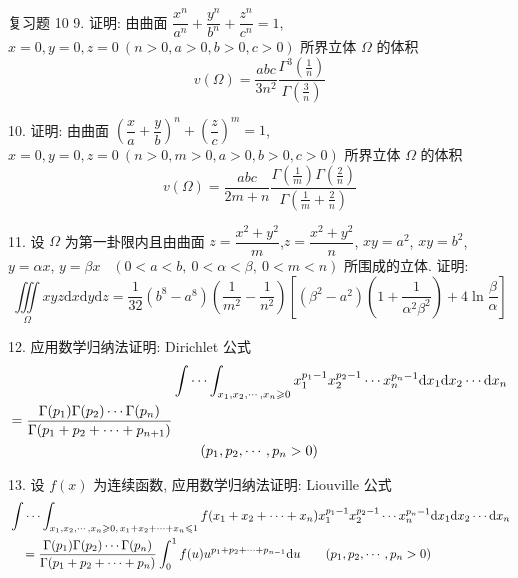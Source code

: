 \begin{exblock}{复习题 10}
9. 证明: 由曲面
$\dfrac{x^{n}}{a^{n}} + \dfrac{y^{n}}{b^{n}} + \dfrac{z^{n}}{c^{n}} = 1$,
$x=0, y=0, z=0\ (n > 0, a > 0, b > 0, c > 0)$
所界立体 $\Omega$ 的体积
\[
v(\Omega) = \frac{abc}{3n^{2}} \frac{\Gamma^{3}\left( \frac{1}{n} \right)}{\Gamma\left( \frac{3}{n} \right)}
\]

10. 证明: 由曲面
$\left( \dfrac{x}{a} + \dfrac{y}{b} \right)^{n} + \left( \dfrac{z}{c} \right)^{m} = 1$,
$x=0, y=0, z=0\ (n > 0, m > 0, a > 0, b > 0, c > 0)$
所界立体 $\Omega$ 的体积
\[
v(\Omega) = \frac{abc}{2m+n}
\frac{\Gamma\left( \frac{1}{m} \right)\Gamma\left( \frac{2}{n} \right)}
{\Gamma\left( \frac{1}{m}+\frac{2}{n} \right)}
\]

11. 设 $\Omega$ 为第一卦限内且由曲面
$z = \dfrac{x^{2}+y^{2}}{m}$,\quad $z = \dfrac{x^{2}+y^{2}}{n}$,\quad
$xy = a^{2}$, $xy = b^{2}$, $y = \alpha x$, $y = \beta x$
\ $(0 < a < b,\ 0 < \alpha < \beta,\ 0 < m < n)$
所围成的立体. 证明:
\[
\iiint\limits_{\Omega} xyz \mathrm{d}x\mathrm{d}y\mathrm{d}z
= \frac{1}{32}\left( b^{8} - a^{8} \right)
\left( \frac{1}{m^{2}} - \frac{1}{n^{2}} \right)
\left[ \left( \beta^{2}-a^{2} \right)
\left( 1 + \frac{1}{\alpha^{2}\beta^{2}} \right) + 4 \ln \frac{\beta}{\alpha} \right]
\]

12. 应用数学归纳法证明: Dirichlet 公式
\begin{align*}
&\idotsint _{x_{1},x_{2},\cdots,x_{n} \geqslant 0}
x_{1}^{p_{1}-1} x_{2}^{p_{2}-1} \cdots x_{n}^{p_{n}-1}
\mathrm{d}x_{1} \mathrm{d}x_{2} \cdots \mathrm{d}x_{n} \notag\\
= \frac{\Gamma(p_{1})\Gamma(p_{2}) \cdots \Gamma(p_{n})}
{\Gamma(p_{1}+p_{2}+\cdots+p_{n+1})}
\notag\\
&\qquad (p_{1}, p_{2}, \cdots, p_{n} > 0)
\end{align*}

13. 设 $f(x)$ 为连续函数, 应用数学归纳法证明: Liouville 公式
\[
\begin{aligned}
&\idotsint _{x_{1},x_{2},\cdots,x_{n} \geqslant 0,\, x_{1}+x_{2}+\cdots+x_{n} \leqslant 1}
f(x_{1}+x_{2}+\cdots+x_{n}) x_{1}^{p_{1}-1} x_{2}^{p_{2}-1} \cdots x_{n}^{p_{n}-1}
\mathrm{d}x_{1} \mathrm{d}x_{2} \cdots \mathrm{d}x_{n} \notag\\
&\quad= \frac{\Gamma(p_{1})\Gamma(p_{2}) \cdots \Gamma(p_{n})}{\Gamma(p_{1}+p_{2}+\cdots+p_{n})}
\int_{0}^{1} f(u) u^{p_{1}+p_{2}+\cdots+p_{n-1}} \mathrm{d}u
\qquad (p_{1}, p_{2}, \cdots, p_{n} > 0) \notag
\end{aligned}
\]


\end{exblock}
